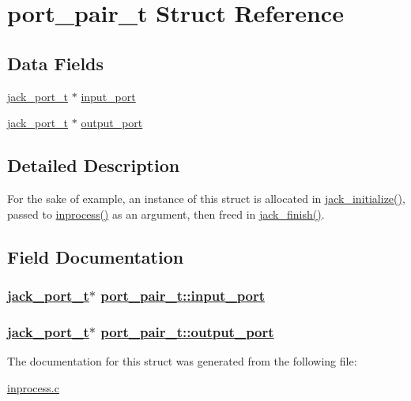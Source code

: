\hypertarget{structport__pair__t}{
\section{port\_\-pair\_\-t Struct Reference}
\label{structport__pair__t}
}
\subsection*{Data Fields}
\begin{CompactItemize}
\item 
\hyperlink{types_8h_fcd71bfba86b3023634d3bb97a454648}{jack\_\-port\_\-t} $\ast$ \hyperlink{structport__pair__t_aeb84bda18e3a96d76d7263e75baaac0}{input\_\-port}
\item 
\hyperlink{types_8h_fcd71bfba86b3023634d3bb97a454648}{jack\_\-port\_\-t} $\ast$ \hyperlink{structport__pair__t_ab6b78920773b8e03ea02816beb0bec2}{output\_\-port}
\end{CompactItemize}


\subsection{Detailed Description}
For the sake of example, an instance of this struct is allocated in \hyperlink{inprocess_8c_89b5a6403e3862e0c9e4fa83c5c6c914}{jack\_\-initialize()}, passed to \hyperlink{inprocess_8c_4eaed4d39683eea6a52416b30300b573}{inprocess()} as an argument, then freed in \hyperlink{inprocess_8c_f3db3e200607bd673b8dd39c8a4111a9}{jack\_\-finish()}. 



\subsection{Field Documentation}
\hypertarget{structport__pair__t_aeb84bda18e3a96d76d7263e75baaac0}{
\subsubsection[input\_\-port]{\setlength{\rightskip}{0pt plus 5cm}\hyperlink{types_8h_fcd71bfba86b3023634d3bb97a454648}{jack\_\-port\_\-t}$\ast$ \hyperlink{structport__pair__t_aeb84bda18e3a96d76d7263e75baaac0}{port\_\-pair\_\-t::input\_\-port}}}
\label{structport__pair__t_aeb84bda18e3a96d76d7263e75baaac0}


\hypertarget{structport__pair__t_ab6b78920773b8e03ea02816beb0bec2}{
\subsubsection[output\_\-port]{\setlength{\rightskip}{0pt plus 5cm}\hyperlink{types_8h_fcd71bfba86b3023634d3bb97a454648}{jack\_\-port\_\-t}$\ast$ \hyperlink{structport__pair__t_ab6b78920773b8e03ea02816beb0bec2}{port\_\-pair\_\-t::output\_\-port}}}
\label{structport__pair__t_ab6b78920773b8e03ea02816beb0bec2}




The documentation for this struct was generated from the following file:\begin{CompactItemize}
\item 
\hyperlink{inprocess_8c}{inprocess.c}\end{CompactItemize}
